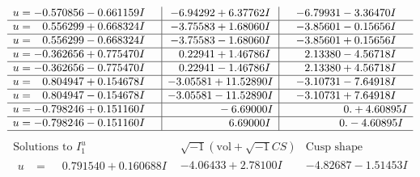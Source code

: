\documentclass[1p]{elsarticle_modified}
\theoremstyle{definition}
\newcommand{\I}{\sqrt{-1}}
\begin{document}
$$\begin{array}{c|c|c}
\begin{aligned}
u &= -0.570856 - 0.661159 I\end{aligned}
 & -6.94292 + 6.37762 I & -6.79931 - 3.36470 I \\ \hline\begin{aligned}
u &= \phantom{-}0.556299 + 0.668324 I\end{aligned}
 & -3.75583 + 1.68060 I & -3.85601 - 0.15656 I \\ \hline\begin{aligned}
u &= \phantom{-}0.556299 - 0.668324 I\end{aligned}
 & -3.75583 - 1.68060 I & -3.85601 + 0.15656 I \\ \hline\begin{aligned}
u &= -0.362656 + 0.775470 I\end{aligned}
 & \phantom{-}0.22941 + 1.46786 I & \phantom{-}2.13380 - 4.56718 I \\ \hline\begin{aligned}
u &= -0.362656 - 0.775470 I\end{aligned}
 & \phantom{-}0.22941 - 1.46786 I & \phantom{-}2.13380 + 4.56718 I \\ \hline\begin{aligned}
u &= \phantom{-}0.804947 + 0.154678 I\end{aligned}
 & -3.05581 + 11.52890 I & -3.10731 - 7.64918 I \\ \hline\begin{aligned}
u &= \phantom{-}0.804947 - 0.154678 I\end{aligned}
 & -3.05581 - 11.52890 I & -3.10731 + 7.64918 I \\ \hline\begin{aligned}
u &= -0.798246 + 0.151160 I\end{aligned}
 & \phantom{-0.000000 } -6.69000 I & \phantom{-0.000000 -}0. + 4.60895 I \\ \hline\begin{aligned}
u &= -0.798246 - 0.151160 I\end{aligned}
 & \phantom{-0.000000 -}6.69000 I & \phantom{-0.000000 } 0. - 4.60895 I\\
 \hline 
 \end{array}$$\newpage$$\begin{array}{c|c|c}  
\text{Solutions to }I^u_{1}& \I (\text{vol} + \sqrt{-1}CS) & \text{Cusp shape}\\
 \hline 
\begin{aligned}
u &= \phantom{-}0.791540 + 0.160688 I\end{aligned}
 & -4.06433 + 2.78100 I & -4.82687 - 1.51453 I \\ \hline\begin{aligned}

\end{aligned}
\end{array}$$
\end{document}
